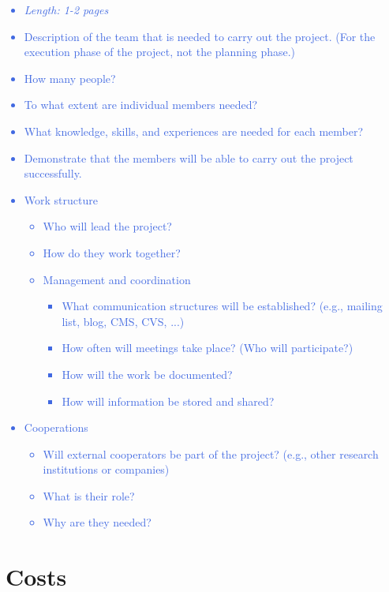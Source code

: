 \documentclass[a4paper,11pt]{article}
\providecommand*{\note}[1]{\small \textcolor{RoyalBlue}{\begin{minipage}{\textwidth}{#1}\end{minipage}}}
\begin{document}
\note{
\begin{itemize}
\item {\em Length: 1-2 pages}
\item Description of the team that is needed to carry out the project. (For the execution phase of the project, not the planning phase.)
\item How many people?
\item To what extent are individual members needed?
\item What knowledge, skills, and experiences are needed for each member?
\item Demonstrate that the members will be able to carry out the project successfully.
\item Work structure
	\begin{itemize}
	\item     Who will lead the project?
	\item     How do they work together?
	\item     Management and coordination
		\begin{itemize}
		\item 	        What communication structures will be established? (e.g., mailing list, blog, CMS, CVS, ...)
		\item 	        How often will meetings take place? (Who will participate?)
		\item 	        How will the work be documented?
		\item 	        How will information be stored and shared?
		\end{itemize}
	\end{itemize}
\item Cooperations
	\begin{itemize}
	\item     Will external cooperators be part of the project? (e.g., other research institutions or companies)
	\item     What is their role?
	 \item    Why are they needed?
	\end{itemize}
\end{itemize}
}

\section{Costs}
\label{sect:costs}
\end{document}
